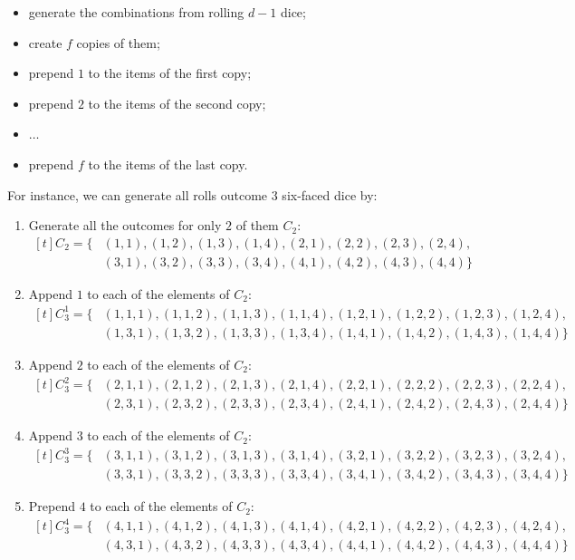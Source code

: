 \begin{itemize}
	\item generate the combinations from rolling $d-1$ dice;
	\item create $f$ copies of them;
	\item prepend $1$ to the items of the first copy;
	\item prepend $2$ to the items of the second copy;
	\item $\ldots$  
	\item prepend $f$ to the items of the last copy.
\end{itemize}


For instance, we can generate all rolls outcome $3$ six-faced dice by:

\begin{enumerate}
	\item Generate all the outcomes for only $2$ of them $C_2$:\\
	$
	\!
	\begin{aligned}[t]
		C_2 =  \{
			& (1,1),(1,2),(1,3),	(1,4),	(2,1),	(2,2),	(2,3),	(2,4),\\
			&(3,1),	(3,2),	(3,3),	(3,4),	(4,1),	(4,2),	(4,3),	(4,4)\}
	\end{aligned}
	$ 
	

	\item Append $1$ to each of the elements of $C_2$:\\
	$
	\!
	\begin{aligned}[t]
		C_3^1 =  \{
			&(1,1,1),(1,1,2),(1,1,3),(1,1,4),(1,2,1),(1,2,2),(1,2,3),(1,2,4),\\
			&(1,3,1),(1,3,2),(1,3,3),(1,3,4),(1,4,1),(1,4,2),(1,4,3),(1,4,4)\}
	\end{aligned}
	$ 


	\item  Append $2$ to each of the elements of $C_2$: \\
	$
	\!
	\begin{aligned}[t]
		C_3^2 =  \{
			&(2,1,1),(2,1,2),(2,1,3),(2,1,4),(2,2,1),(2,2,2),(2,2,3),(2,2,4),\\
			&(2,3,1),(2,3,2),(2,3,3),(2,3,4),(2,4,1),(2,4,2),(2,4,3),(2,4,4)\}
	\end{aligned}
	$ 



	\item  Append $3$ to each of the elements of $C_2$:\\
	$
	\!
	\begin{aligned}[t]
		C_3^3 =  \{
			&(3,1,1),(3,1,2),(3,1,3),(3,1,4),(3,2,1),(3,2,2),(3,2,3),(3,2,4),\\
			&(3,3,1),(3,3,2),(3,3,3),(3,3,4),(3,4,1),(3,4,2),(3,4,3),(3,4,4)\}
	\end{aligned}
	$ 
	\item Prepend $4$ to each of the elements of $C_2$:\\
	$
	\!
	\begin{aligned}[t]
		C_3^4 =  \{
			& (4,1,1),(4,1,2),(4,1,3),(4,1,4),(4,2,1),(4,2,2),(4,2,3),(4,2,4),\\
			&(4,3,1),(4,3,2),(4,3,3),(4,3,4),(4,4,1),(4,4,2),(4,4,3),(4,4,4)\}
	\end{aligned}
	$ 


\end{enumerate}
